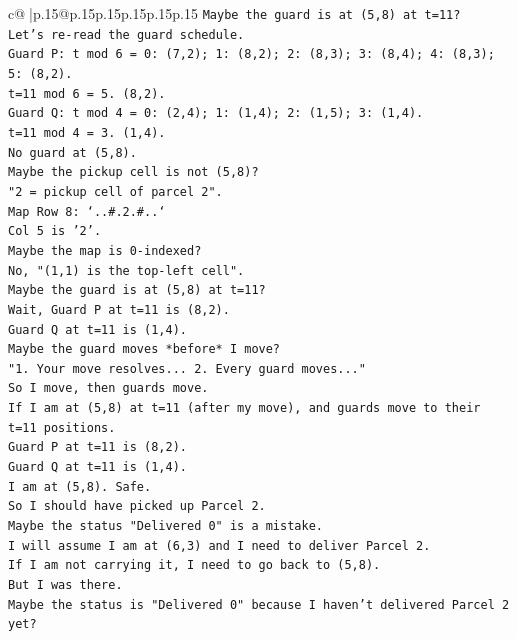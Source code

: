 \documentclass{article}
\begin{document}
{\begin{supertabular}{c@{$\;$}|p{.15\linewidth}@{}p{.15\linewidth}p{.15\linewidth}p{.15\linewidth}p{.15\linewidth}p{.15\linewidth}}
{{{\texttt{Maybe the guard is at (5,8) at t=11?} \\
\texttt{Let's re{-}read the guard schedule.} \\
\texttt{Guard P: t mod 6 = 0: (7,2); 1: (8,2); 2: (8,3); 3: (8,4); 4: (8,3); 5: (8,2).} \\
\texttt{t=11 mod 6 = 5. (8,2).} \\
\texttt{Guard Q: t mod 4 = 0: (2,4); 1: (1,4); 2: (1,5); 3: (1,4).} \\
\texttt{t=11 mod 4 = 3. (1,4).} \\
\texttt{No guard at (5,8).} \\
\texttt{Maybe the pickup cell is not (5,8)?} \\
\texttt{"2 = pickup cell of parcel 2".} \\
\texttt{Map Row 8: `..\#.2.\#..`} \\
\texttt{Col 5 is '2'.} \\
\texttt{Maybe the map is 0{-}indexed?} \\
\texttt{No, "(1,1) is the top{-}left cell".} \\
\texttt{Maybe the guard is at (5,8) at t=11?} \\
\texttt{Wait, Guard P at t=11 is (8,2).} \\
\texttt{Guard Q at t=11 is (1,4).} \\
\texttt{Maybe the guard moves *before* I move?} \\
\texttt{"1. Your move resolves... 2. Every guard moves..."} \\
\texttt{So I move, then guards move.} \\
\texttt{If I am at (5,8) at t=11 (after my move), and guards move to their t=11 positions.} \\
\texttt{Guard P at t=11 is (8,2).} \\
\texttt{Guard Q at t=11 is (1,4).} \\
\texttt{I am at (5,8). Safe.} \\
\texttt{So I should have picked up Parcel 2.} \\
\texttt{Maybe the status "Delivered 0" is a mistake.} \\
\texttt{I will assume I am at (6,3) and I need to deliver Parcel 2.} \\
\texttt{If I am not carrying it, I need to go back to (5,8).} \\
\texttt{But I was there.} \\
\texttt{Maybe the status is "Delivered 0" because I haven't delivered Parcel 2 yet?} \\
}}}
\end{supertabular}}
\end{document}
